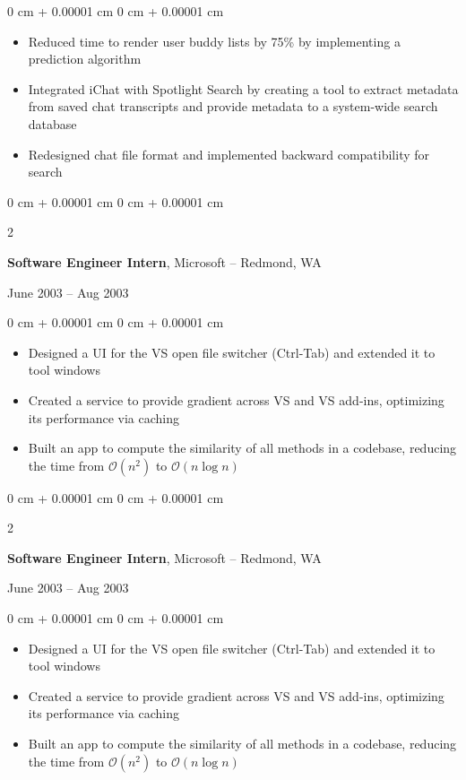 \documentclass[10pt, letterpaper]{article}
\newenvironment{highlights}{
    \begin{itemize}[
        topsep=0.10 cm,
        parsep=0.10 cm,
        partopsep=0pt,
        itemsep=0pt,
        leftmargin=0 cm + 20pt
    ]
}{
    \end{itemize}
} %
\newenvironment{onecolentry}{
    \begin{adjustwidth}{
        0 cm + 0.00001 cm
    }{
        0 cm + 0.00001 cm
    }
}{
    \end{adjustwidth}
} %
\newenvironment{twocolentry}[2][]{
    \onecolentry
    \def\secondColumn{#2}
    \setcolumnwidth{\fill, 4.5 cm}
    \begin{paracol}{2}
}{
    \switchcolumn \raggedleft \secondColumn
    \end{paracol}
    \endonecolentry
} %
\begin{document}
    \vspace{0.10 cm}
    \begin{onecolentry}
        \begin{highlights}
            \item Reduced time to render user buddy lists by 75\% by implementing a prediction algorithm
            \item Integrated iChat with Spotlight Search by creating a tool to extract metadata from saved chat transcripts and provide metadata to a system-wide search database
            \item Redesigned chat file format and implemented backward compatibility for search
        \end{highlights}
    \end{onecolentry}

    \vspace{0.2 cm}

    \begin{twocolentry}{
        June 2003 – Aug 2003
    }
        \textbf{Software Engineer Intern}, Microsoft -- Redmond, WA
    \end{twocolentry}

    \vspace{0.10 cm}
    \begin{onecolentry}
        \begin{highlights}
            \item Designed a UI for the VS open file switcher (Ctrl-Tab) and extended it to tool windows
            \item Created a service to provide gradient across VS and VS add-ins, optimizing its performance via caching
            \item Built an app to compute the similarity of all methods in a codebase, reducing the time from $\mathcal{O}(n^2)$ to $\mathcal{O}(n \log n)$
        \end{highlights}
    \end{onecolentry}

    \vspace{0.2 cm}

    \begin{twocolentry}{
        June 2003 – Aug 2003
    }
        \textbf{Software Engineer Intern}, Microsoft -- Redmond, WA
    \end{twocolentry}

    \vspace{0.10 cm}
    \begin{onecolentry}
        \begin{highlights}
            \item Designed a UI for the VS open file switcher (Ctrl-Tab) and extended it to tool windows
            \item Created a service to provide gradient across VS and VS add-ins, optimizing its performance via caching
            \item Built an app to compute the similarity of all methods in a codebase, reducing the time from $\mathcal{O}(n^2)$ to $\mathcal{O}(n \log n)$
        \end{highlights}
    \end{onecolentry}
\end{document}
